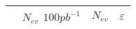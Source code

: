 \documentclass[colclass=cmspaper]{combine}
\begin{document}
\begin{linenumbers}




\begin{table}[htbp]
\begin{center}
\begin{tabular}{|c|c|c|c|}
\hline
\hline
 & $N_{ev}$ $100pb^{-1}$ & $N_{ev}$ & $\varepsilon$ \\
\hline
\hline


\end{tabular}
\end{center}
\end{table}
\end{linenumbers}
\end{document}
